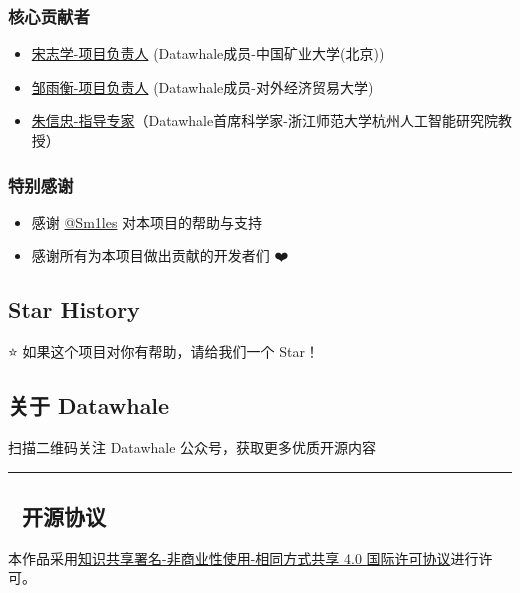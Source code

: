 \documentclass[12pt,a4paper]{book}
\begin{document}
\subsubsection{核心贡献者}\label{ux6838ux5fc3ux8d21ux732eux8005}

\begin{itemize}
\tightlist
\item
  \href{https://github.com/KMnO4-zx}{宋志学-项目负责人}
  (Datawhale成员-中国矿业大学(北京))
\item
  \href{https://github.com/logan-zou}{邹雨衡-项目负责人}
  (Datawhale成员-对外经济贸易大学)
\item
  \href{https://xinzhongzhu.github.io/}{朱信忠-指导专家}（Datawhale首席科学家-浙江师范大学杭州人工智能研究院教授）
\end{itemize}

\subsubsection{特别感谢}\label{ux7279ux522bux611fux8c22}

\begin{itemize}
\tightlist
\item
  感谢 \href{https://github.com/Sm1les}{@Sm1les} 对本项目的帮助与支持
\item
  感谢所有为本项目做出贡献的开发者们 ❤️
\end{itemize}

\subsection{Star History}\label{star-history}

⭐ 如果这个项目对你有帮助，请给我们一个 Star！

\subsection{关于 Datawhale}\label{ux5173ux4e8e-datawhale}

扫描二维码关注 Datawhale 公众号，获取更多优质开源内容

\begin{center}\rule{0.5\linewidth}{0.5pt}\end{center}

\subsection{📜 开源协议}\label{ux5f00ux6e90ux534fux8bae}

本作品采用\href{http://creativecommons.org/licenses/by-nc-sa/4.0/}{知识共享署名-非商业性使用-相同方式共享
4.0 国际许可协议}进行许可。
\end{document}
